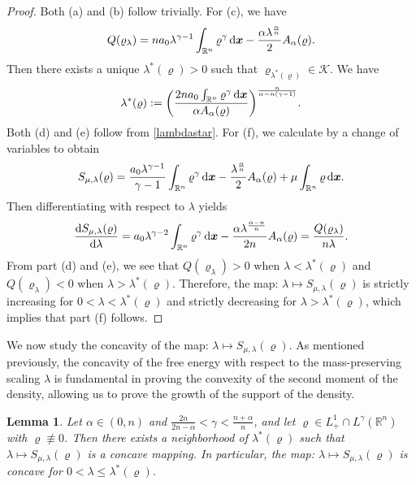 \documentclass[reqno,11pt]{amsart}
\numberwithin{equation}{section}
\newtheorem{lemma}[theorem]{Lemma}
\theoremstyle{definition}
\def\d{{\rm d}}
\def\dd{{\, \rm d}}
\begin{document}
\begin{proof}
Both (a) and (b) follow trivially. For (c), we have
\[
Q(\varrho_\lambda) = n a_0 \lambda^{\gamma - 1} \int_{\mathbb{R}^n} \varrho^\gamma \dd \boldsymbol{x} - \frac{\alpha \lambda^{\frac{\alpha}{n}}}{2} A_\alpha(\varrho).
\]
Then there exists a unique $\lambda^*(\varrho) > 0$ such that $\varrho_{\lambda^*(\varrho)} \in \mathcal{K}$. We have
\begin{equation}\label{lambdastar}
   \lambda^*(\varrho) := \bigg ( \frac{2na_0 \int_{\mathbb{R}^n} \varrho^\gamma \dd \boldsymbol{x}}{\alpha A_\alpha(\varrho)} \bigg )^{\frac{n}{\alpha - n(\gamma - 1)}}.
\end{equation}
Both (d) and (e) follow from \eqref{lambdastar}. For (f), we calculate by a change of variables 
to obtain
\[
S_{\mu,\lambda}(\varrho) = \frac{a_0 \lambda^{\gamma - 1}}{\gamma - 1} \int_{\mathbb{R}^n} \varrho^\gamma \dd \boldsymbol{x} - \frac{\lambda^{\frac{\alpha}{n}}}{2} A_\alpha(\varrho) + \mu \int_{\mathbb{R}^n} \varrho \dd \boldsymbol{x}.
\]
Then differentiating with respect to $\lambda$ yields
\begin{equation}\label{firstderiva}
    \frac{\d S_{\mu,\lambda}(\varrho)}{\d \lambda} = a_0 \lambda^{\gamma - 2} \int_{\mathbb{R}^n} \varrho^\gamma \dd \boldsymbol{x} - \frac{\alpha \lambda^{\frac{\alpha - n}{n}}}{2n} A_\alpha(\varrho) = \frac{Q(\varrho_\lambda)}{n\lambda}.
\end{equation}
From part (d) and (e), we see that $Q(\varrho_\lambda) > 0$ when $\lambda < \lambda^*(\varrho)$
and $Q(\varrho_\lambda) < 0$ when $\lambda > \lambda^*(\varrho)$. 
Therefore, the map: $\lambda \mapsto S_{\mu,\lambda}(\varrho)$ is strictly increasing for $0 < \lambda < \lambda^*(\varrho)$ and strictly decreasing for $\lambda > \lambda^*(\varrho)$, which implies that
part (f) follows.
\end{proof}

We now study the concavity of the map: $\lambda \mapsto S_{\mu,\lambda}(\varrho)$. 
As mentioned previously, the concavity of the free energy with respect to the mass-preserving scaling $\lambda$ is fundamental in proving the convexity of the second moment of the density,
allowing us to prove the growth of the support of the density.

\begin{lemma}\label{concavity}
 Let $\alpha \in (0,n)$ and 
 $\frac{2n}{2n - \alpha} < \gamma < \frac{n + \alpha}{n}$, and 
 let $\varrho \in L^1_+ \cap L^\gamma (\mathbb{R}^n)$ with  $\varrho \not\equiv 0$. 
 Then there exists a neighborhood of $\lambda^*(\varrho)$ such that $\lambda \mapsto S_{\mu,\lambda}(\varrho)$ is a concave mapping. In particular, the map{\rm :} $\lambda \mapsto S_{\mu,\lambda}(\varrho)$ is concave for $0 < \lambda \leq \lambda^*(\varrho)$.
\end{lemma}
\end{document}
